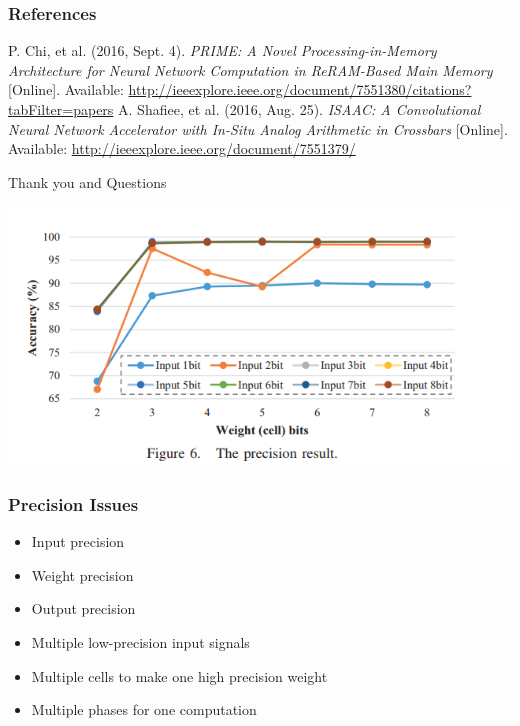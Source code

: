 \documentclass[hyperref={colorlinks}]{beamer}
\begin{document}
\begin{frame}
	\frametitle{References}
	\footnotesize{
		\begin{thebibliography}{9} %
			P. Chi, et al. (2016, Sept. 4).
			\emph{PRIME: A Novel Processing-in-Memory Architecture for Neural Network Computation in ReRAM-Based Main Memory} [Online].
			Available: \url{http://ieeexplore.ieee.org/document/7551380/citations?tabFilter=papers}
			A. Shafiee, et al. (2016, Aug. 25).
			\emph{ISAAC: A Convolutional Neural Network Accelerator with In-Situ Analog Arithmetic in Crossbars} [Online].
			Available: \url{http://ieeexplore.ieee.org/document/7551379/}
		\end{thebibliography}
	}
\end{frame}

\begin{frame}
	\Huge{\centerline{Thank you and Questions}}
\end{frame}

\begin{frame}
	\includegraphics[scale=0.4]{precision_graph.png}
\end{frame}


\begin{frame}
	\frametitle{Precision Issues}
	\begin{itemize}
		\item Input precision
		\item Weight precision
		\item Output precision
	\end{itemize}
	\begin{itemize}
		\item Multiple low-precision input signals
		\item Multiple cells to make one high precision weight
		\item Multiple phases for one computation
	\end{itemize}
\end{frame}
\end{document}
